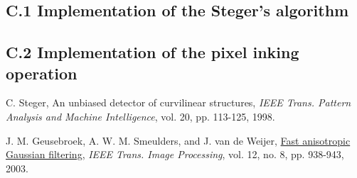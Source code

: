 \documentclass{article}
\begin{document}
\subsection*{C.1 Implementation of the Steger's algorithm}



\subsection*{C.2 Implementation of the pixel inking operation}



\pagebreak
\begin{thebibliography}{9}
\fontsize{10pt}{12pt}\selectfont
\raggedright

        C. Steger, An unbiased detector of curvilinear structures, 
        \emph{IEEE Trans. Pattern Analysis and Machine Intelligence},
        vol. 20, pp. 113-125, 1998.

        J. M. Geusebroek, A. W. M. Smeulders, and J. van de Weijer, 
        \ul{Fast anisotropic Gaussian filtering},
        \emph{IEEE Trans. Image Processing}, vol. 12, no. 8, pp. 938-943, 2003.


\end{thebibliography}


\end{document}

